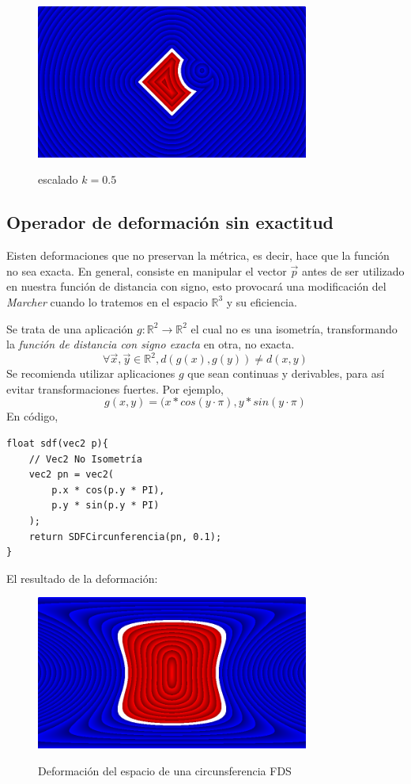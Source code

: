 \begin{figure}[H]
  \centering
  \captionsetup{justification=centering}%
  \includegraphics[width=0.8\textwidth]{secciones/imagenes/sdf/2d/sdf_subtracted_scale.png}\label{fig:substraction}
  \caption{ escalado \(k=0.5\)}
\end{figure}

\subsection{Operador de deformación sin exactitud}
Eisten deformaciones que no preservan la métrica, es decir, hace que la función no sea exacta. En general, consiste en manipular el vector \(\Vec{p}\) antes de ser utilizado en nuestra función de distancia con signo, esto provocará una modificación del \textit{Marcher} cuando lo tratemos en el espacio \( \mathbb{R}^3 \) y su eficiencia.

Se trata de una aplicación \(g:\mathbb{R}^2\longrightarrow \mathbb{R}^2\) el cual no es una isometría, transformando la \textit{función de distancia con signo exacta} en otra, no exacta.
\[ \forall \Vec{x}, \Vec{y} \in \mathbb{R}^2, d(g(x), g(y)) \neq d(x,y) \]
Se recomienda utilizar aplicaciones \( g\) que sean continuas y derivables, para así evitar transformaciones fuertes. Por ejemplo,
\[g(x,y)=(x * cos(y \cdot \pi), y * sin(y \cdot \pi)\]
En código,
\begin{lstlisting}
float sdf(vec2 p){
	// Vec2 No Isometría
	vec2 pn = vec2(
	    p.x * cos(p.y * PI),
	    p.y * sin(p.y * PI)
	);
	return SDFCircunferencia(pn, 0.1);
}
\end{lstlisting}
El resultado de la deformación:
\begin{figure}[H]
  \centering
  \captionsetup{justification=centering}%
  \includegraphics[width=0.8\textwidth]{secciones/imagenes/sdf/2d/sdf_deform.png}\label{fig:deform}
  \caption{Deformación del espacio de una circunsferencia FDS}
\end{figure}

